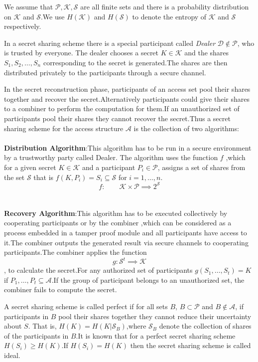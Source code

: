 \documentclass{llncs}
\begin{document}
We assume that $\mathcal{P},\mathcal{K},\mathcal{S}$ are all finite sets and there is a probability distribution on $\mathcal{K}$ and $\mathcal{S}$.We use $H(\mathcal{K})$ and $H(\mathcal{S})$ to denote the entropy of $\mathcal{K}$ and $\mathcal{S}$ respectively.

In a secret sharing scheme there is a special participant called \textit{Dealer} $\mathcal{D} \notin \mathcal{P}$, who is trusted by everyone. The dealer chooses a secret $K \in \mathcal{K}$ and the shares $S_1,S_2,\ldots,S_n$ corresponding to the secret is generated.The shares are then distributed privately to the participants through a secure channel.

In the secret reconstruction phase, participants of an access set pool their shares together and recover the secret.Alternatively participants could give their shares to a combiner to perform the computation for them.If an unauthorized set of participants pool their shares they cannot recover the secret.Thus a secret sharing scheme for the access structure $\mathcal{A}$ is the collection of two algorithms:\\ \\
\textbf{Distribution Algorithm}:This algorithm has to be run in a secure environment by a trustworthy party called Dealer. The algorithm uses the function $f$ ,which for a given secret $K \in \mathcal{K}$ and a participant $P_i \in \mathcal{P}$, assigns a set of shares from the set $\mathcal{S}$ that is $f(K,P_i)=S_i \subseteq \mathcal{S}$ for $i=1,\ldots,n$.$$f:\qquad \mathcal{K}\times \mathcal{P} \implies 2^\mathcal{S}$$\\ \\
\textbf{Recovery Algorithm}:This algorithm has to be executed collectively by cooperating participants or by the combiner ,which can be considered as a process embedded in a tamper proof module and all participants have access to it.The combiner outputs the generated result via secure channels to cooperating participants.The combiner applies the function $$g:\mathcal{S}^t \implies \mathcal{K}$$, to  calculate the secret.For any authorized set of participants $g(S_1,\ldots,S_t)=K$ if ${P_1,\ldots,P_t} \subseteq \mathcal{A}$.If the group of participant belongs to an unauthorized set, the combiner fails to compute the secret.

A secret sharing scheme is called perfect if for all sets $B$, $ B \subset \mathcal{P}$ and $B \notin \mathcal{A}$, if participants in $B$ pool their shares together they cannot reduce their uncertainty about $S$. That is, $H(K)=H(K|\mathcal{S}_B)$,where $\mathcal{S}_B$ denote the collection of shares of the participants in $B$.It is known that for a perfect secret sharing scheme $H(S_i) \geq H(K)$.If $H(S_i) = H(K)$ then the secret sharing scheme is called ideal.
\end{document}
